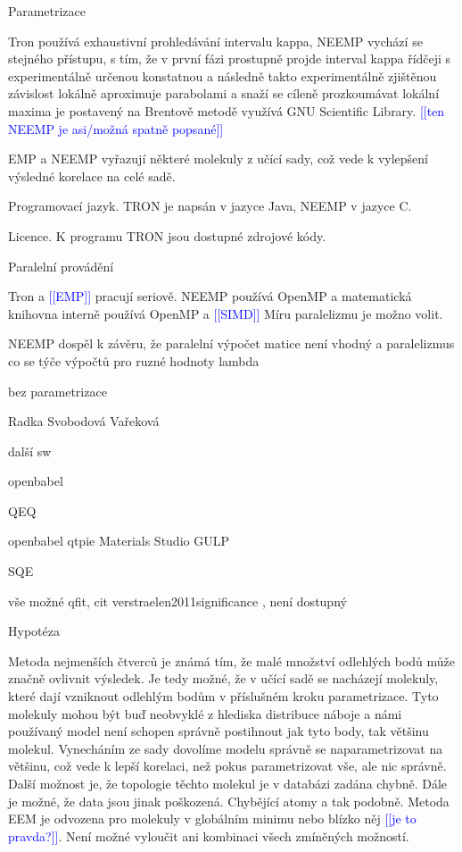 \documentclass[10pt,draft,oneside]{fithesis2}
\newcommand\todo[1]{\textcolor{blue}{[[#1]]}}
\begin{document}
Parametrizace

Tron používá exhaustivní prohledávání intervalu kappa, NEEMP vychází se stejného přístupu, s tím, že v první fázi prostupně projde interval kappa řídčeji s experimentálně určenou konstatnou a následně takto experimentálně zjištěnou závislost lokálně aproximuje parabolami a snaží se cíleně prozkoumávat lokální maxima je postavený na Brentově metodě využívá GNU Scientific Library. \todo{ten NEEMP je asi/možná spatně popsané}

EMP a NEEMP vyřazují některé molekuly z učící sady, což vede k vylepšení výsledné korelace na celé sadě.

Programovací jazyk. TRON je napsán v jazyce Java, NEEMP v jazyce C.

Licence. K programu TRON jsou dostupné zdrojové kódy.

Paralelní provádění

Tron a \todo{EMP} pracují seriově. NEEMP používá OpenMP a matematická knihovna interně používá OpenMP a \todo{SIMD} Míru paralelizmu je možno volit.

NEEMP dospěl k závěru, že paralelní výpočet matice není vhodný a paralelizmus co se týče výpočtů pro ruzné hodnoty lambda

bez parametrizace

Radka Svobodová Vařeková 

další sw

openbabel

QEQ

openbabel
qtpie
Materials Studio
GULP



SQE

vše možné
qfit, cit verstraelen2011significance , není dostupný

Hypotéza

Metoda nejmenších čtverců je známá tím, že malé množství odlehlých bodů může značně ovlivnit výsledek. Je tedy možné, že v učící sadě se nacházejí molekuly, které dají vzniknout odlehlým bodům v příslušném kroku parametrizace. Tyto molekuly mohou být buď neobvyklé z hlediska distribuce náboje a námi používaný model není schopen správně postihnout jak tyto body, tak většinu molekul. Vynecháním ze sady dovolíme modelu správně se naparametrizovat na většinu, což vede k lepší korelaci, než pokus parametrizovat vše, ale nic správně. Další možnost je, že topologie těchto molekul je v databázi zadána chybně. Dále je možné, že data jsou jinak poškozená. Chybějící atomy a tak podobně. Metoda EEM je odvozena pro molekuly v globálním minimu nebo blízko něj \todo{je to pravda?}. Není možné vyloučit ani kombinaci všech zmíněných možností.
\end{document}

